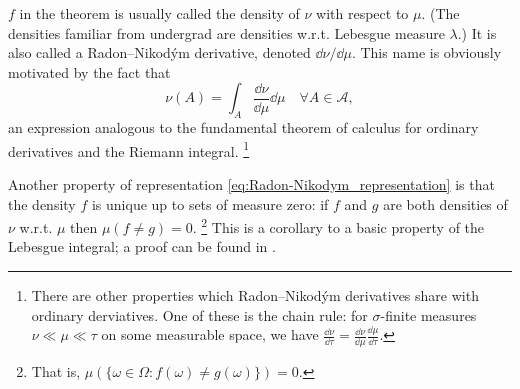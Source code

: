 \documentclass[11pt,letterpaper,reqno,oneside]{article}
\begin{document}
$f$ in the theorem is usually called the density of $\nu$ with respect to $\mu$. (The densities familiar from undergrad are densities w.r.t. Lebesgue measure $\lambda$.) It is also called a Radon--Nikod\'{y}m derivative, denoted $\dd \nu / \dd \mu$. This name is obviously motivated by the fact that
%
\begin{equation*}
	\nu(A) = \int_A \frac{\dd \nu}{\dd \mu} \dd \mu 
	\quad\forall A \in \mathcal{A} ,
\end{equation*}
%
an expression analogous to the fundamental theorem of calculus for ordinary derivatives and the Riemann integral.%
	\footnote{There are other properties which Radon--Nikod\'{y}m derivatives share with ordinary derviatives. One of these is the chain rule: for $\sigma$-finite measures $\nu \ll \mu \ll \tau$ on some measurable space, we have $\tfrac{\dd \nu}{\dd \tau} = \tfrac{\dd \nu}{\dd \mu} \tfrac{\dd \mu}{\dd \tau}$.}


Another property of representation \eqref{eq:Radon-Nikodym_representation} is that the density $f$ is unique up to sets of measure zero: if $f$ and $g$ are both densities of $\nu$ w.r.t. $\mu$ then $\mu( f \neq g ) = 0$.%
	\footnote{That is, $\mu( \{ \omega \in \Omega : f(\omega) \neq g(\omega) \} ) = 0$.}
This is a corollary to a basic property of the Lebesgue integral; a proof can be found in \textcite[][Theorem 16.10]{Billingsley1995}.
\end{document}
